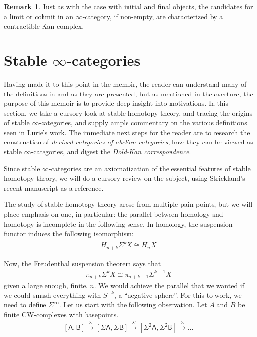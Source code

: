 \documentclass[10pt]{amsart}
\makeatletter
\newcommand{\8}{\ensuremath{\infty}}
\newcommand{\0}{\ensuremath{\overset{\rightarrow}{0}}}
\newcommand{\1}{\ensuremath{\mathbf{1}}}
\newcommand{\sq}[1]{\ensuremath{\mathsf{[#1]}}}
\theoremstyle{definition}
\newtheorem{remark}[definition]{Remark}
\def\subsection{\@startsection{subsection}{2}
  \z@{.5\linespacing\@plus.7\linespacing}{.6\baselineskip}{\centering}}
\numberwithin{definition}{subsection}
\numberwithin{definition}{section}
\makeatother
\begin{document}
\begin{remark}
  Just as with the case with initial and final objects, the candidates for a limit or colimit in an \8-category, if non-empty, are characterized by a contractible Kan complex.
\end{remark}

\section{Stable \texorpdfstring{\8}{∞}-categories}
Having made it to this point in the memoir, the reader can understand many of the definitions in \cite{Lurie09b} and \cite{Lurie12} as they are presented, but as mentioned in the overture, the purpose of this memoir is to provide deep insight into motivations. In this section, we take a cursory look at stable homotopy theory, and tracing the origins of stable \8-categories, and supply ample commentary on the various definitions seen in Lurie's work. The immediate next steps for the reader are to research the construction of \emph{derived categories of abelian categories}, how they can be viewed as stable \8-categories, and digest the \emph{Dold-Kan correspondence}.

\subsection{Motivation}
Since stable \8-categories are an axiomatization of the essential features of stable homotopy theory, we will do a cursory review on the subject, using Strickland's recent manuscript \cite{Strickland20} as a reference.

The study of stable homotopy theory arose from multiple pain points, but we will place emphasis on one, in particular: the parallel between homology and homotopy is incomplete in the following sense. In homology, the suspension functor induces the following isomorphism:
\begin{align*}
  \tilde{H}_{n + k} \Sigma^k X \cong \tilde{H}_n X
\end{align*}

Now, the Freudenthal suspension theorem says that
\begin{align*}
  \pi_{n + k} \Sigma^k X \cong \pi_{n + k + 1} \Sigma^{k + 1} X
\end{align*}
given a large enough, finite, $n$. We would achieve the parallel that we wanted if we could smash everything with $S^{-k}$, a ``negative sphere''. For this to work, we need to define $\Sigma^\infty$. Let us start with the following observation. Let $A$ and $B$ be finite CW-complexes with basepoints.
\begin{align*}
  \sq{A, B} \xrightarrow{\Sigma} \sq{\Sigma A, \Sigma B} \xrightarrow{\Sigma} \sq{\Sigma^2 A, \Sigma^2 B} \xrightarrow{\Sigma} \ldots
\end{align*}
\end{document}
